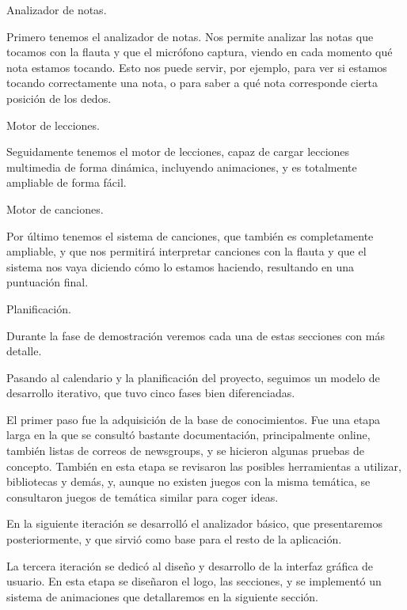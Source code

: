 \documentclass[landscape]{article}
\newenvironment{nota}
{%
\begin{framed} \noindent\itshape
}
{%
\end{framed}\vspace{-0.5cm} }
\begin{document}
\begin{multicols*}{2}
\begin{nota}
  Analizador de notas.
\end{nota}

Primero tenemos el analizador de notas. Nos permite analizar las notas que
tocamos con la flauta y que el micrófono captura, viendo en cada momento qué
nota estamos tocando. Esto nos puede servir, por ejemplo, para ver si estamos
tocando correctamente una nota, o para saber a qué nota corresponde cierta
posición de los dedos.

\begin{nota}
  Motor de lecciones.
\end{nota}

Seguidamente tenemos el motor de lecciones, capaz de cargar lecciones multimedia
de forma dinámica, incluyendo animaciones, y es totalmente ampliable de forma
fácil.

\begin{nota}
  Motor de canciones.
\end{nota}

Por último tenemos el sistema de canciones, que también es completamente
ampliable, y que nos permitirá interpretar canciones con la flauta y que el
sistema nos vaya diciendo cómo lo estamos haciendo, resultando en una puntuación
final.

\begin{nota}
  Planificación.
\end{nota}
Durante la fase de demostración veremos cada una de estas secciones con más detalle.

Pasando al calendario y la planificación del proyecto, seguimos un modelo de
desarrollo iterativo, que tuvo cinco fases bien diferenciadas.

 El primer paso fue la adquisición de la base de
conocimientos. Fue una etapa larga en la que se consultó bastante documentación,
principalmente online, también listas de correos de newsgroups, y se hicieron
algunas pruebas de concepto. También en esta etapa se revisaron las posibles
herramientas a utilizar, bibliotecas y demás, y, aunque no existen juegos con la
misma temática, se consultaron juegos de temática similar para coger ideas.

 En la siguiente iteración se desarrolló el analizador básico,
que presentaremos posteriormente, y que sirvió como base para el resto de la
aplicación.

 La tercera iteración se dedicó al diseño y desarrollo de la
interfaz gráfica de usuario. En esta etapa se diseñaron el logo, las secciones,
y se implementó un sistema de animaciones que detallaremos en la siguiente sección.


\end{multicols*}
\end{document}
